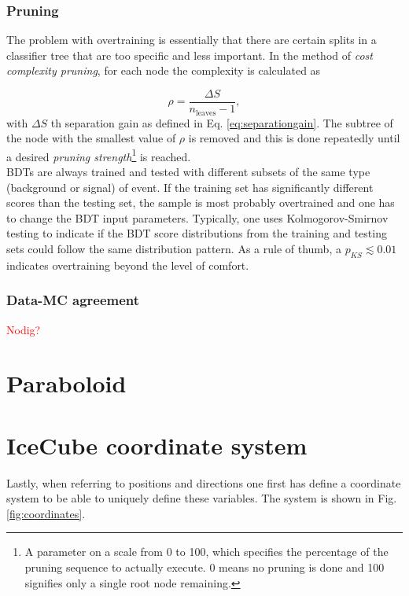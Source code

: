 \subsubsection{Pruning}
The problem with overtraining is essentially that there are certain splits in a classifier tree that are too specific and less important. In the method of \textit{cost complexity pruning}, for each node the complexity is calculated as

\begin{equation}
\rho = \frac{\Delta S}{n_{\textrm{leaves}} -1},
\end{equation}
\noindent with $\Delta S$ th separation gain as defined in Eq. \ref{eq:separationgain}. The subtree of the node with the smallest value of $\rho$ is removed and this is done repeatedly until a desired \textit{pruning strength}\footnote{A parameter on a scale from 0 to 100, which specifies the percentage of the pruning sequence to actually execute. 0 means no pruning is done and 100 signifies only a single root node remaining.} is reached.\\
\newline
\noindent BDTs are always trained and tested with different subsets of the same type (background or signal) of event. If the training set has significantly different scores than the testing set, the sample is most probably overtrained and one has to change the BDT input parameters. Typically, one uses Kolmogorov-Smirnov testing to indicate if the BDT score distributions from the training and testing sets could follow the same distribution pattern. As a rule of thumb, a $p_{KS} \lesssim 0.01$ indicates overtraining beyond the level of comfort.


\subsubsection{Data-MC agreement}
\textcolor{red}{Nodig?}	

\section{Paraboloid}
\label{sec:paraboloid}

\section{IceCube coordinate system}
Lastly, when referring to positions and directions one first has define a coordinate system to be able to uniquely define these variables. The system is shown in Fig. \ref{fig:coordinates}.\\
\newline


